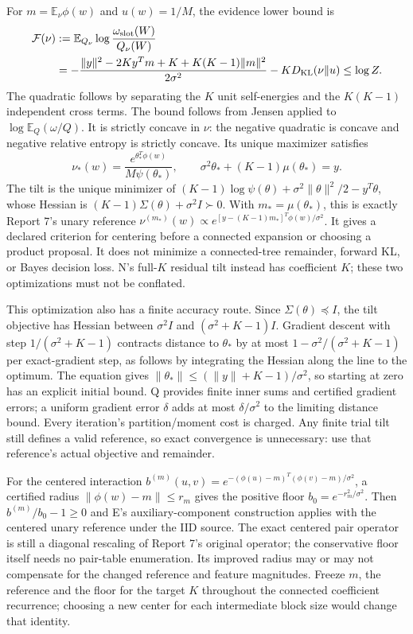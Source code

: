 \documentclass[10pt,a4paper]{article}
\newcommand{\E}{\mathbb E}
\begin{document}
For $m=\E_\nu\phi(w)$ and $u(w)=1/M$, the evidence lower bound is
\begin{align}
 \mathcal F(\nu)
 &:=\E_{Q_\nu}\log\frac{\omega_{\rm slot}(W)}{Q_\nu(W)}\\
 &=-\frac{\|y\|^2-2K y^Tm+K+K(K-1)\|m\|^2}{2\sigma^2}
            -K D_{\rm KL}(\nu\|u)\leq\log Z.
 \label{eq:variational-product}
\end{align}
The quadratic follows by separating the $K$ unit self-energies and the $K(K-1)$ independent cross terms.
The bound follows from Jensen applied to $\log\E_Q(\omega/Q)$.
It is strictly concave in $\nu$: the negative quadratic is concave and negative relative entropy is
strictly concave. Its unique maximizer satisfies
\begin{equation}
 \nu_*(w)=\frac{e^{\theta_*^T\phi(w)}}{M\psi(\theta_*)},\qquad
 \sigma^2\theta_*+(K-1)\mu(\theta_*)=y.
 \label{eq:variational-reference-optimum}
\end{equation}
The tilt is the unique minimizer of
$(K-1)\log\psi(\theta)+\sigma^2\|\theta\|^2/2-y^T\theta$, whose Hessian is
$(K-1)\Sigma(\theta)+\sigma^2I\succ0$.
With $m_*=\mu(\theta_*)$, this is exactly Report 7's unary reference
$\nu^{(m_*)}(w)\propto e^{[y-(K-1)m_*]^T\phi(w)/\sigma^2}$.
It gives a declared criterion for centering before a connected expansion or choosing a product proposal.
It does not minimize a connected-tree remainder, forward KL, or Bayes decision loss.
N's full-$K$ residual tilt instead has coefficient $K$; these two optimizations must not be conflated.

This optimization also has a finite accuracy route. Since $\Sigma(\theta)\preceq I$,
the tilt objective has Hessian between $\sigma^2I$ and $(\sigma^2+K-1)I$.
Gradient descent with step $1/(\sigma^2+K-1)$ contracts distance to $\theta_*$ by at most
$1-\sigma^2/(\sigma^2+K-1)$ per exact-gradient step, as follows by integrating the Hessian along
the line to the optimum. The equation gives
$\|\theta_*\|\leq(\|y\|+K-1)/\sigma^2$, so starting at zero has an explicit initial bound.
Q provides finite inner sums and certified gradient errors; a uniform gradient error $\delta$
adds at most $\delta/\sigma^2$ to the limiting distance bound.
Every iteration's partition/moment cost is charged. Any finite trial tilt still defines a valid
reference, so exact convergence is unnecessary: use that reference's actual objective and remainder.

For the centered interaction $b^{(m)}(u,v)=e^{-(\phi(u)-m)^T(\phi(v)-m)/\sigma^2}$,
a certified radius $\|\phi(w)-m\|\leq r_m$ gives the positive floor
$b_0=e^{-r_m^2/\sigma^2}$. Then $b^{(m)}/b_0-1\geq0$ and E's auxiliary-component construction applies
with the centered unary reference under the IID source. The exact centered pair operator is still a diagonal rescaling of
Report 7's original operator; the conservative floor itself needs no pair-table enumeration.
Its improved radius may or may not compensate for the changed reference and feature magnitudes.
Freeze $m$, the reference and the floor for the target $K$ throughout the connected coefficient recurrence;
choosing a new center for each intermediate block size would change that identity.
\end{document}
